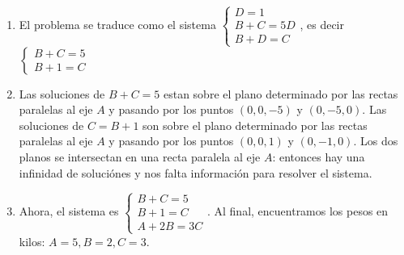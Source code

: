 \begin{enumerate}

\item
El problema se traduce como el sistema
$\left\{
\begin{aligned}
  D = 1 \\
  B + C = 5D \\
  B + D = C
\end{aligned}\right.$, es decir $\left\{
\begin{aligned}
  B + C = 5 \\
  B + 1 = C
\end{aligned}\right.$
\item Las soluciones de $B + C = 5$ estan sobre el plano determinado por las
  rectas paralelas al eje $A$ y pasando por los puntos $(0, 0, -5)$ y
  $(0, -5, 0)$. Las soluciones de $C = B + 1$ son sobre el plano determinado
  por las rectas paralelas al eje $A$ y pasando por los puntos $(0, 0, 1)$ y
  $(0, -1, 0)$. Los dos planos se intersectan en una recta paralela al
  eje $A$: entonces hay
  una infinidad de soluciónes y nos falta información para resolver el sistema.
\item Ahora, el sistema es  $\left\{
\begin{aligned}
  B + C = 5 \\
  B + 1 = C \\
  A + 2B = 3C
\end{aligned}\right.$. Al final, encuentramos los pesos en kilos:
$A = 5, B = 2, C = 3$.

\end{enumerate}
